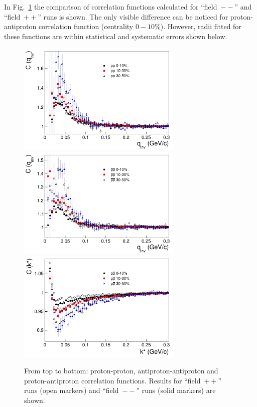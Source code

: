 In Fig.~\ref{cfsyst2} the comparison of correlation functions calculated for ``field~$--$'' and ``field~$++$'' runs is shown. The only visible difference can be noticed for proton-antiproton correlation function (centrality $0-10\%$). However, radii fitted for these functions are within statistical and systematic errors shown below.
\begin{figure}%
  \centering
  \includegraphics[width=0.7\textwidth]{cfPPsyst2}
  \includegraphics[width=0.7\textwidth]{cfAPAPsyst2}
  \includegraphics[width=0.7\textwidth]{cfPAPsyst2}
  \caption{From top to bottom: proton-proton, antiproton-antiproton and proton-antiproton correlation functions. Results for  ``field~$++$'' runs (open markers) and ``field~$--$'' runs (solid markers) are shown.}
  \label{cfsyst2}
\end{figure}


